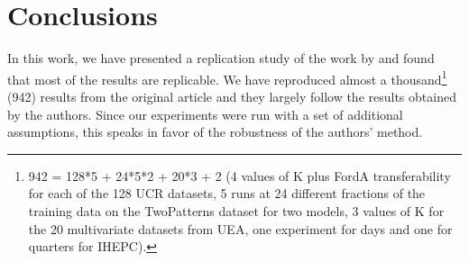 \documentclass{article}
\begin{document}


\section{Conclusions}
\label{conc}
In this work, we have presented a replication study of the work by \cite{FranceschiUnsupervised2019} and found that most of the results are replicable. We have reproduced almost a thousand\footnote{942 = 128*5 + 24*5*2 + 20*3 + 2 (4 values of K plus FordA transferability for each of the 128 UCR datasets, 5 runs at 24 different fractions of the training data on the TwoPatterns dataset for two models, 3 values of K for the 20 multivariate datasets from UEA, one experiment for days and one for quarters for IHEPC).} (942) results from the original article and they largely follow the results obtained by the authors. Since our experiments were run with a set of additional assumptions, this speaks in favor of the robustness of the authors' method.
\end{document}
